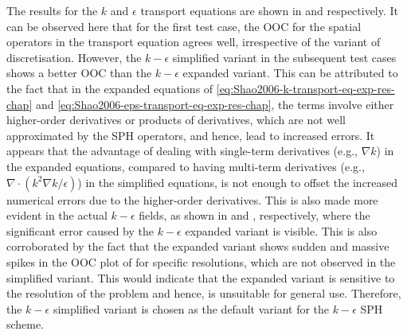 The results for the $k$ and $\epsilon$ transport equations are shown in  and  respectively. It can be observed here that for the first test case, the OOC for the spatial operators in the transport equation agrees well, irrespective of the variant of discretisation.
However, the $k-\epsilon$ simplified variant in the subsequent test cases shows a better OOC than the $k-\epsilon$ expanded variant.
This can be attributed to the fact that in the expanded equations of \eqref{eq:Shao2006-k-transport-eq-exp-res-chap} and \eqref{eq:Shao2006-eps-transport-eq-exp-res-chap}, the terms involve either higher-order derivatives or products of derivatives, which are not well approximated by the SPH operators, and hence, lead to increased errors. It appears that the advantage of dealing with single-term derivatives (e.g., $\nabla k$) in the expanded equations, compared to having multi-term derivatives (e.g., $\nabla \cdot (k^2\nabla k / \epsilon)$) in the simplified equations, is not enough to offset the increased numerical errors due to the higher-order derivatives.
This is also made more evident in the actual $k-\epsilon$ fields, as shown in  and , respectively, where the significant error caused by the $k-\epsilon$ expanded variant is visible. This is also corroborated by the fact that the expanded variant shows sudden and massive spikes in the OOC plot of  for specific resolutions, which are not observed in the simplified variant. This would indicate that the expanded variant is sensitive to the resolution of the problem and hence, is unsuitable for general use.
Therefore, the $k-\epsilon$ simplified variant is chosen as the default variant for the $k-\epsilon$ SPH scheme.

